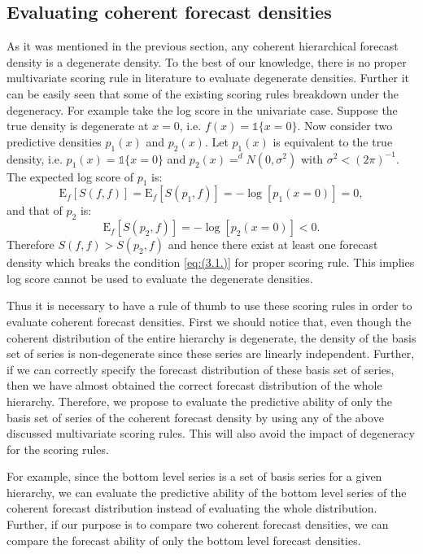 \documentclass[a4paper, 11pt]{article}
\def\E{\text{E}}
\begin{document}
	\subsection{Evaluating coherent forecast densities}
	
	As it was mentioned in the previous section, any coherent hierarchical forecast density is a degenerate density. To the best of our knowledge, there is no proper multivariate scoring rule in literature to evaluate degenerate densities. Further it can be easily seen that some of the existing scoring rules breakdown under the degeneracy. For example take the log score in the univariate case. Suppose the true density is degenerate at $x=0$, i.e. $f(x)=\mathbb{1}\{x=0\}$.  Now consider two predictive densities $p_1(x)$ and $p_2(x)$. Let $p_1(x)$ is equivalent to the true density, i.e. $p_1(x)=\mathbb{1}\{x=0\}$ and $p_2(x) =^d N(0,\sigma^2)$ with $\sigma^2 < (2\pi)^{-1}$. The expected log score of $p_1$ is:
	$$
	\E_f[S(f,f)] = \E_f[S(p_1,f)] = -\log[p_1(x=0)]=0,
	$$
	and that of $p_2$ is:
	$$
	\E_f[S(p_2,f)] = -\log[p_2(x=0)]<0.
	$$
	Therefore $S(f,f) > S(p_2,f)$ and hence there exist at least one forecast density which breaks the condition \eqref{eq:(3.1.)} for proper scoring rule. This implies log score cannot be used to evaluate the degenerate densities.
	
	Thus it is necessary to have a rule of thumb to use these scoring rules in order to evaluate coherent forecast densities. First we should notice that, even though the coherent distribution of the entire hierarchy is degenerate, the density of the basis set of series is non-degenerate since these series are linearly independent. Further, if we can correctly specify the forecast distribution of these basis set of series, then we have almost obtained the correct forecast distribution of the whole hierarchy. Therefore, we propose to evaluate the predictive ability of only the basis set of series of the coherent forecast density by using any of the above discussed multivariate scoring rules. This will also avoid the impact of degeneracy for the scoring rules.
	
	For example, since the bottom level series is a set of basis series for a given hierarchy, we can evaluate the predictive ability of the bottom level series of the coherent forecast distribution instead of evaluating the whole distribution. Further, if our purpose is to compare two coherent forecast densities, we can compare the forecast ability of only the bottom level forecast densities.
	
\end{document}
